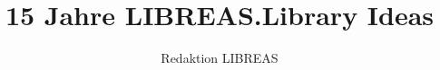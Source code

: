 \title{15 Jahre LIBREAS.\newlineCover Library Ideas}
\author{Redaktion LIBREAS}
\renewcommand{\lsSeries}{dummyseries}



\renewcommand{\lsSeriesNumber}{}
\BackBody{~}